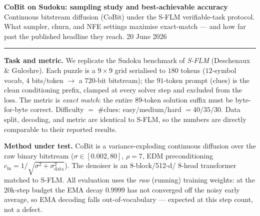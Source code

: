 \documentclass[10pt]{article}
\begin{document}
{\Large\bfseries CoBit on Sudoku: sampling study and best-achievable accuracy}\\[2pt]
{\small Continuous bitstream diffusion (CoBit) under the S-FLM verifiable-task protocol.
What sampler, churn, and NFE settings maximise exact-match --- and how far past the published
headline they reach. \hfill 20 June 2026}

\vspace{2pt}\hrule\vspace{4pt}

\textbf{Task and metric.} We replicate the Sudoku benchmark of \emph{S-FLM} (Deschenaux \&
Gulcehre). Each puzzle is a $9{\times}9$ grid serialised to $180$ tokens ($12$-symbol vocab,
$4$ bits/token $\rightarrow$ a $720$-bit bitstream); the $91$-token prompt (clues) is the
clean conditioning prefix, clamped at every solver step and excluded from the loss. The metric
is \emph{exact match}: the entire $89$-token solution suffix must be byte-for-byte correct.
Difficulty $=$ \#clues: easy/medium/hard $=40/35/30$. Data split, decoding, and metric are
identical to S-FLM, so the numbers are directly comparable to their reported results.

\textbf{Method under test.} CoBit is a variance-exploding continuous diffusion over the raw
binary bitstream ($\sigma\in[0.002,80]$, $\rho{=}7$, EDM preconditioning
$c_\mathrm{in}=1/\sqrt{\sigma^2+\sigma_\mathrm{data}^2}$). The denoiser is an 8-block/512-d/
8-head transformer matched to S-FLM. All evaluation uses the \emph{raw} (running) training
weights: at the 20k-step budget the EMA decay $0.9999$ has not converged off the noisy early
average, so EMA decoding falls out-of-vocabulary --- expected at this step count, not a defect.
\end{document}
